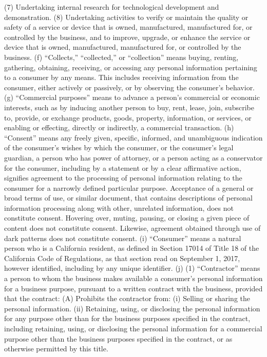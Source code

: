 (7) Undertaking internal research for technological development and demonstration.
(8) Undertaking activities to verify or maintain the quality or safety of a service or device that is owned, manufactured, manufactured for, or controlled by the business, and to improve, upgrade, or enhance the service or device that is owned, manufactured, manufactured for, or controlled by the business.
(f) “Collects,” “collected,” or “collection” means buying, renting, gathering, obtaining, receiving, or accessing any personal information pertaining to a consumer by any means. This includes receiving information from the consumer, either actively or passively, or by observing the consumer’s behavior.
(g) “Commercial purposes” means to advance a person’s commercial or economic interests, such as by inducing another person to buy, rent, lease, join, subscribe to, provide, or exchange products, goods, property, information, or services, or enabling or effecting, directly or indirectly, a commercial transaction.
(h) “Consent” means any freely given, specific, informed, and unambiguous indication of the consumer’s wishes by which the consumer, or the consumer’s legal guardian, a person who has power of attorney, or a person acting as a conservator for the consumer, including by a statement or by a clear affirmative action, signifies agreement to the processing of personal information relating to the consumer for a narrowly defined particular purpose. Acceptance of a general or broad terms of use, or similar document, that contains descriptions of personal information processing along with other, unrelated information, does not constitute consent. Hovering over, muting, pausing, or closing a given piece of content does not constitute consent. Likewise, agreement obtained through use of dark patterns does not constitute consent.
(i) “Consumer” means a natural person who is a California resident, as defined in Section 17014 of Title 18 of the California Code of Regulations, as that section read on September 1, 2017, however identified, including by any unique identifier.
(j) (1) “Contractor” means a person to whom the business makes available a consumer’s personal information for a business purpose, pursuant to a written contract with the business, provided that the contract:
(A) Prohibits the contractor from:
(i) Selling or sharing the personal information.
(ii) Retaining, using, or disclosing the personal information for any purpose other than for the business purposes specified in the contract, including retaining, using, or disclosing the personal information for a commercial purpose other than the business purposes specified in the contract, or as otherwise permitted by this title.
